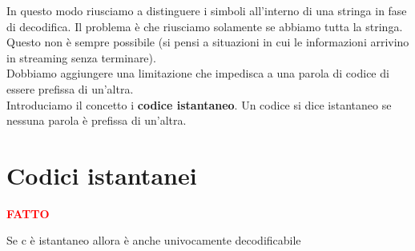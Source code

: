 \documentclass[12pt]{report}
\begin{document}
    \noindent In questo modo riusciamo a distinguere i simboli all'interno di una stringa in fase di decodifica. Il problema è che riusciamo solamente se abbiamo tutta la stringa. Questo non è sempre possibile (si pensi a situazioni in cui le informazioni arrivino in streaming senza terminare). \\ Dobbiamo aggiungere una limitazione che impedisca a una parola di codice di essere prefissa di un'altra. \\
    Introduciamo il concetto i \textbf{codice istantaneo}. Un codice si dice istantaneo se nessuna parola è prefissa di un'altra.

    \section{Codici istantanei}

    \vspace{5px}
    \begin{tcolorbox}
        \textbf{\textcolor{red}{FATTO}}
        \begin{center}
            Se c è istantaneo allora è anche univocamente decodificabile
        \end{center}
    \end{tcolorbox}

    \vspace{5px}
\end{document}
